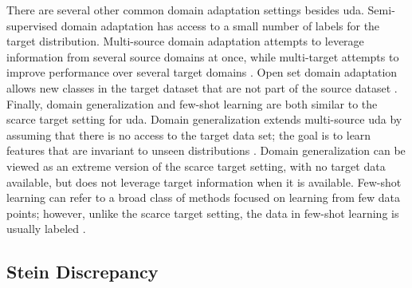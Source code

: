 There are several other common domain adaptation settings besides \ac{uda}.
Semi-supervised domain adaptation has access to a small number of labels for the target distribution.
Multi-source domain adaptation attempts to leverage information from several source domains at once, while multi-target attempts to improve performance over several target domains \citep{zhao2020multisourcedomainadaptationdeep}.
Open set domain adaptation allows new classes in the target dataset that are not part of the source dataset \citep{panareda_busto_open_2017}.
Finally, domain generalization and few-shot learning are both similar to the scarce target setting for \ac{uda}.
Domain generalization extends multi-source \ac{uda} by assuming that there is no access to the target data set; the goal is to learn features that are invariant to unseen distributions \citep{wang_generalizing_2022}.
Domain generalization can be viewed as an extreme version of the scarce target setting, with no target data available, but does not leverage target information when it is available.
Few-shot learning can refer to a broad class of methods focused on learning from few data points; however, unlike the scarce target setting, the data in few-shot learning is usually labeled \citep{parnami2022learning}.


\subsection{Stein Discrepancy}

